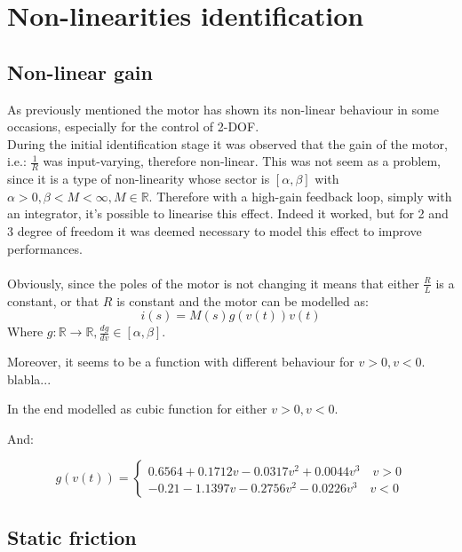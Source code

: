 \chapter{Non-linearities identification}

\section{Non-linear gain}
As previously mentioned the motor has shown its non-linear behaviour in some occasions, especially for the control of 2-DOF. \\
During the initial identification stage it was observed that the gain of the motor, i.e.: $\frac{1}{R}$ was input-varying, therefore non-linear. This was not seem as a problem, since it is a type of non-linearity whose sector is $[\alpha, \beta]$ with $\alpha > 0, \beta <M < \infty, M \in \mathbb{R}$. Therefore with a high-gain feedback loop, simply with an integrator, it's possible to linearise this effect. Indeed it worked, but for 2 and 3 degree of freedom it was deemed necessary to model this effect to improve performances.\\ \\
Obviously, since the poles of the motor is not changing  it means that either $\frac{R}{L}$ is a constant, or that $R$ is constant and the motor can be modelled as:
\begin{equation}
i(s)=M(s)g(v(t))v(t)
\end{equation}
Where $g: \mathbb{R} \to \mathbb{R}, \frac{dg}{dv} \in [\alpha, \beta]$.

Moreover, it seems to be a function with different behaviour for $v>0,v<0$. blabla...

In the end modelled as cubic function for either $v>0,v<0$.

And:

\begin{equation}
g(v(t)) = \begin{cases}
0.6564+0.1712v-0.0317v^2+0.0044v^3 \quad v>0 \\
-0.21-1.1397v-0.2756v^2-0.0226v^3 \quad v< 0
\end{cases}
\end{equation}
\section{Static friction}
